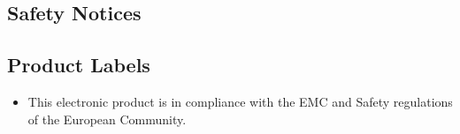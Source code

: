 \subsection*{Safety Notices}


\subsection*{Product Labels}
\begin{itemize}
  \item[\CE{cerm scaled \magstep5}] This electronic product is in compliance
                                    with the EMC and Safety regulations of
                                    the European Community.
\end{itemize}










\newpage